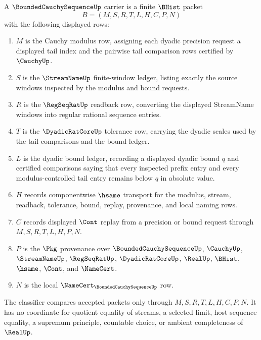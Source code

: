 \begin{definition}
\label{def:bounded-cauchy-sequence}
A $\BoundedCauchySequenceUp$ carrier is a finite $\BHist$ packet
$$
B=(M,S,R,T,L,H,C,P,N)
$$
with the following displayed rows:
\begin{enumerate}
\item $M$ is the Cauchy modulus row, assigning each dyadic precision request a displayed tail index and the pairwise tail comparison rows certified by $\CauchyUp$.
\item $S$ is the $\StreamNameUp$ finite-window ledger, listing exactly the source windows inspected by the modulus and bound requests.
\item $R$ is the $\RegSeqRatUp$ readback row, converting the displayed StreamName windows into regular rational sequence entries.
\item $T$ is the $\DyadicRatCoreUp$ tolerance row, carrying the dyadic scales used by the tail comparisons and the bound ledger.
\item $L$ is the dyadic bound ledger, recording a displayed dyadic bound $q$ and certified comparisons saying that every inspected prefix entry and every modulus-controlled tail entry remains below $q$ in absolute value.
\item $H$ records componentwise $\hsame$ transport for the modulus, stream, readback, tolerance, bound, replay, provenance, and local naming rows.
\item $C$ records displayed $\Cont$ replay from a precision or bound request through $M,S,R,T,L,H,P,N$.
\item $P$ is the $\Pkg$ provenance over $\BoundedCauchySequenceUp$, $\CauchyUp$, $\StreamNameUp$, $\RegSeqRatUp$, $\DyadicRatCoreUp$, $\RealUp$, $\BHist$, $\hsame$, $\Cont$, and $\NameCert$.
\item $N$ is the local $\NameCert_{\BoundedCauchySequenceUp}$ row.
\end{enumerate}
The classifier compares accepted packets only through $M,S,R,T,L,H,C,P,N$. It has no coordinate for quotient equality of streams, a selected limit, host sequence equality, a supremum principle, countable choice, or ambient completeness of $\RealUp$.
\end{definition}

